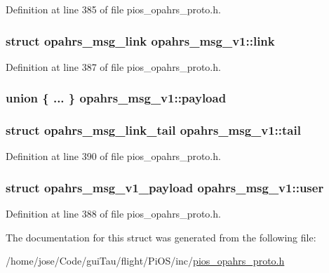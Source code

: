 Definition at line 385 of file pios\-\_\-opahrs\-\_\-proto.\-h.

\hypertarget{structopahrs__msg__v1_a0fbede654e43c8c3291a531f19b8cb92}{
\subsubsection[{link}]{\setlength{\rightskip}{0pt plus 5cm}struct {\bf opahrs\-\_\-msg\-\_\-link} opahrs\-\_\-msg\-\_\-v1\-::link}}\label{structopahrs__msg__v1_a0fbede654e43c8c3291a531f19b8cb92}


Definition at line 387 of file pios\-\_\-opahrs\-\_\-proto.\-h.

\hypertarget{structopahrs__msg__v1_a34206550b5d8d586efe708b33f143418}{
\subsubsection[{payload}]{\setlength{\rightskip}{0pt plus 5cm}union \{ ... \}   opahrs\-\_\-msg\-\_\-v1\-::payload}}\label{structopahrs__msg__v1_a34206550b5d8d586efe708b33f143418}
\hypertarget{structopahrs__msg__v1_a380eead781498e5b770b8981e85eb650}{
\subsubsection[{tail}]{\setlength{\rightskip}{0pt plus 5cm}struct {\bf opahrs\-\_\-msg\-\_\-link\-\_\-tail} opahrs\-\_\-msg\-\_\-v1\-::tail}}\label{structopahrs__msg__v1_a380eead781498e5b770b8981e85eb650}


Definition at line 390 of file pios\-\_\-opahrs\-\_\-proto.\-h.

\hypertarget{structopahrs__msg__v1_aaaa1d2189da75e6b6ba29e1ac7f94c27}{
\subsubsection[{user}]{\setlength{\rightskip}{0pt plus 5cm}struct {\bf opahrs\-\_\-msg\-\_\-v1\-\_\-payload} opahrs\-\_\-msg\-\_\-v1\-::user}}\label{structopahrs__msg__v1_aaaa1d2189da75e6b6ba29e1ac7f94c27}


Definition at line 388 of file pios\-\_\-opahrs\-\_\-proto.\-h.



The documentation for this struct was generated from the following file\-:\begin{DoxyCompactItemize}
\item 
/home/jose/\-Code/gui\-Tau/flight/\-Pi\-O\-S/inc/\hyperlink{pios__opahrs__proto_8h}{pios\-\_\-opahrs\-\_\-proto.\-h}\end{DoxyCompactItemize}
